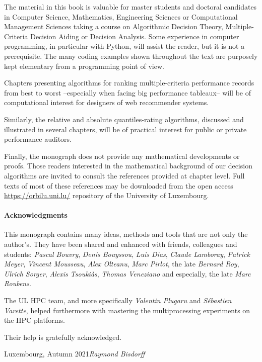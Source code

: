 
The material in this book is valuable for master students and doctoral candidates in Computer Science, Mathematics, Engineering Sciences or Computational Management Sciences taking a course on Algorithmic Decision Theory, Multiple-Criteria Decision Aiding or Decision Analysis. Some experience in computer programming, in particular with Python, will assist the reader, but it is not a prerequisite. The many coding examples shown throughout the text are purposely kept elementary from a programming point of view. 

Chapters presenting algorithms for ranking multiple-criteria performance records from best to worst --especially when facing big performance tableaux-- will be of computational interest for designers of web recommender systems. 

Similarly, the relative and absolute quantiles-rating algorithms, discussed and illustrated in several chapters, will be of practical interest for public or private performance auditors.

Finally, the monograph does not provide any mathematical developments or proofs. Those readers interested in the mathematical background of our decision algorithms are invited to consult the references provided at chapter level. Full texts of most of these references may be downloaded from the open access \href{https://orbilu.uni.lu/}{https://orbilu.uni.lu/} repository of the University of Luxembourg. 

\pagebreak

\paragraph{\textbf{Acknowledgments}}

This monograph contains many ideas, methods and tools that are not only the author’s. They have been shared and enhanced with friends, colleagues and students: \emph{Pascal Bouvry}, \emph{Denis Bouyssou}, \emph{Luis Dias}, \emph{Claude Lamboray}, \emph{Patrick Meyer}, \emph{Vincent Mousseau}, \emph{Alex Olteanu}, \emph{Marc Pirlot}, the late \emph{Bernard Roy}, \emph{Ulrich Sorger}, \emph{Alexis Tsouki\`as}, \emph{Thomas Veneziano} and especially, the late \emph{Marc Roubens}.

The UL HPC team, and more specifically \emph{Valentin Plugaru} and \emph{Sébastien Varette}, helped furthermore with mastering the multiprocessing experiments on the HPC platforms.

Their help is gratefully acknowledged.

\vspace{\baselineskip}
\begin{flushright}\noindent
Luxembourg, Autumn 2021\hfill \emph{Raymond Bisdorff}\\
\end{flushright}


